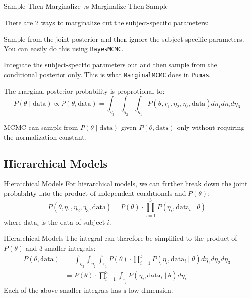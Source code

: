\begin{frame}{Sample-Then-Marginalize vs Marginalize-Then-Sample}
	\begin{vfilleditems}
		\item There are 2 ways to marginalize out the subject-specific parameters:
			\begin{vfilleditems}
				\item Sample from the joint posterior and then ignore the subject-specific parameters. You can easily do this using \lstinline{BayesMCMC}.
				\item Integrate the subject-specific parameters out and then sample from the conditional posterior only. This is what \lstinline{MarginalMCMC} does in \lstinline{Pumas}.
			\end{vfilleditems}
		\item The marginal posterior probability is proprotional to:
		$$
			P(\theta \mid \text{data}) \propto P(\theta, \text{data}) = \int_{\eta_3} \int_{\eta_2} \int_{\eta_1} P(\theta, \eta_1, \eta_2, \eta_3, \text{data}) d\eta_1 d\eta_2 d\eta_3
		$$
		\item MCMC can sample from $P(\theta \mid \text{data})$ given $P(\theta, \text{data})$ only without requiring the normalization constant.
	\end{vfilleditems}
\end{frame}

\subsection{Hierarchical Models}
\begin{frame}{Hierarchical Models}
    For hierarchical models, we can further break down the joint probability into the product of independent conditionals and $P(\theta)$:
	$$
		P(\theta, \eta_1, \eta_2, \eta_3, \text{data}) = P(\theta) \cdot \prod_{i=1}^3 P(\eta_i, \text{data}_i \mid \theta)
	$$
	where $\text{data}_i$ is the data of subject $i$.
\end{frame}

\begin{frame}{Hierarchical Models}
	The integral can therefore be simplified to the product of $P(\theta)$ and 3 smaller integrals:
	$$
		\begin{aligned}
			P(\theta, \text{data}) & = \int_{\eta_3} \int_{\eta_2} \int_{\eta_1} P(\theta) \cdot \prod_{i=1}^3 P(\eta_i, \text{data}_i \mid \theta) d\eta_1 d\eta_2 d\eta_3 \\
			& = P(\theta) \cdot \prod_{i=1}^3 \int_{\eta_i} P(\eta_i, \text{data}_i \mid \theta) d\eta_i
		\end{aligned}
	$$
	\vfill
	Each of the above smaller integrals has a low dimension.
\end{frame}

